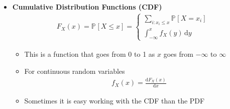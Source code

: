 \documentclass[11pt]{article}
\newcommand{\Prob}[2][]{\mathbb{P}_{#1\!}\left[ #2 \right]}
\newcommand{\dd}{\mathrm{d}}
\begin{document}
\begin{itemize}
\begin{itemize}
\end{itemize}
\item \textbf{Cumulative Distribution Functions (CDF)}
\begin{align*}
 F_X(x) = \Prob{X\leq x} =
 \begin{cases}
   \sum\limits_{i: x_i\leq x} \Prob{X=x_i} \\
   \int_{-\infty}^x f_X(y) \, \dd y
 \end{cases}
\end{align*}
\begin{itemize}
\item This is a function that goes from 0 to 1 as \(x\) goes from 
\(-\infty\) to \(\infty\)
\item For continuous random variables
\begin{align*}
  f_X(x) = \frac{\dd F_X(x)}{\dd x}
\end{align*}
\item Sometimes it is easy working with the CDF than the PDF
\end{itemize}
\end{itemize}
\end{document}
